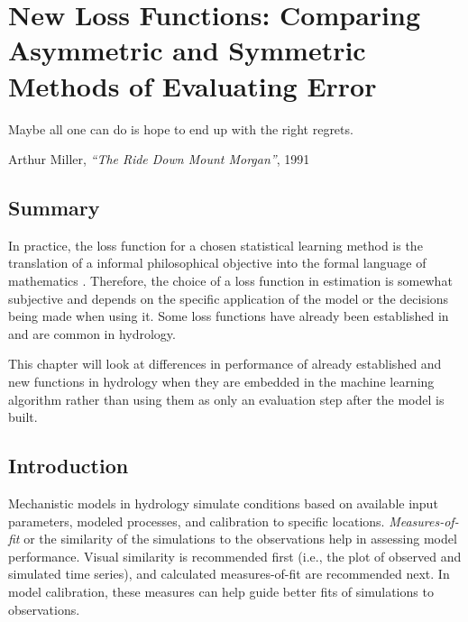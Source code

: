 \chapter[New Loss Functions]{New Loss Functions: Comparing Asymmetric and Symmetric Methods of Evaluating Error} \label{ch3:loss}
\setlength{\epigraphwidth}{4.5in}
\epigraph{Maybe all one can do is hope to end up with the right regrets.}{Arthur Miller, \textit{``The Ride Down Mount Morgan''}, 1991}

\section*{Summary}
In practice, the loss function for a chosen statistical learning method is the translation of a informal philosophical objective into the formal language of mathematics \cite{hennig2007some}. Therefore, the choice of a loss function in estimation is somewhat subjective and depends on the specific application of the model or the decisions being made when using it. Some loss functions have already been established in and are common in hydrology. 

This chapter will look at differences in performance of already established and new functions in hydrology when they are embedded in the machine learning algorithm rather than using them as only an evaluation step after the model is built. 

\section{Introduction}
Mechanistic models in hydrology simulate conditions based on available input parameters, modeled processes, and calibration to specific locations. \textit{Measures-of-fit} or the similarity of the simulations to the observations help in assessing model performance. Visual similarity is recommended first (i.e., the plot of observed and simulated time series), and calculated measures-of-fit are recommended next. In model calibration, these measures can help guide better fits of simulations to observations.  

